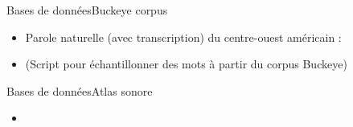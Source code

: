 \documentclass[xcolor=dvipsnames, onlymath, 10pt, aspectratio=169, handout]{beamer}
\begin{document}
\begin{frame}{Bases de données}{Buckeye corpus}

	\begin{itemize}
		\item[] Parole naturelle (avec transcription) du centre-ouest américain : 
	\end{itemize}

	\begin{center}
	\end{center}

	\begin{itemize}
		\item[] (Script pour échantillonner des mots à partir du corpus Buckeye)
	\end{itemize}

\end{frame}



\begin{frame}{Bases de données}{Atlas sonore}

	\begin{itemize}
		\item {}
	\end{itemize}

	\begin{center}
	\end{center}

\end{frame}


\end{document}
